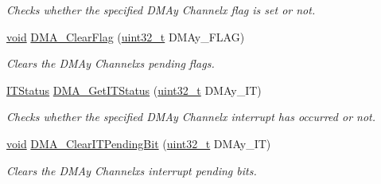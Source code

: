 \begin{DoxyCompactItemize}
\begin{DoxyCompactList}\small\item\em Checks whether the specified D\+M\+Ay Channelx flag is set or not. \end{DoxyCompactList}\item 
\hyperlink{usb__devapi_8h_afabf60e7f57651d6d595a02c75f07cd0}{void} \hyperlink{group___d_m_a___exported___functions_ga25cdca360f309c8ceb7c206cd9ad9119}{D\+M\+A\+\_\+\+Clear\+Flag} (\hyperlink{_p_e___types_8h_a33594304e786b158f3fb30289278f5af}{uint32\+\_\+t} D\+M\+Ay\+\_\+\+F\+L\+AG)
\begin{DoxyCompactList}\small\item\em Clears the D\+M\+Ay Channelx\textquotesingle{}s pending flags. \end{DoxyCompactList}\item 
\hyperlink{agilefox_2library_2inc_2stm32f10x__type_8h_aacbd7ed539db0aacd973a0f6eca34074}{I\+T\+Status} \hyperlink{group___d_m_a___exported___functions_ga9287331247150fe84d03ecd7ad8adb52}{D\+M\+A\+\_\+\+Get\+I\+T\+Status} (\hyperlink{_p_e___types_8h_a33594304e786b158f3fb30289278f5af}{uint32\+\_\+t} D\+M\+Ay\+\_\+\+IT)
\begin{DoxyCompactList}\small\item\em Checks whether the specified D\+M\+Ay Channelx interrupt has occurred or not. \end{DoxyCompactList}\item 
\hyperlink{usb__devapi_8h_afabf60e7f57651d6d595a02c75f07cd0}{void} \hyperlink{group___d_m_a___exported___functions_ga91a7340e5b334a942f3eb1e05ed5f67a}{D\+M\+A\+\_\+\+Clear\+I\+T\+Pending\+Bit} (\hyperlink{_p_e___types_8h_a33594304e786b158f3fb30289278f5af}{uint32\+\_\+t} D\+M\+Ay\+\_\+\+IT)
\begin{DoxyCompactList}\small\item\em Clears the D\+M\+Ay Channelx\textquotesingle{}s interrupt pending bits. \end{DoxyCompactList}\end{DoxyCompactItemize}
